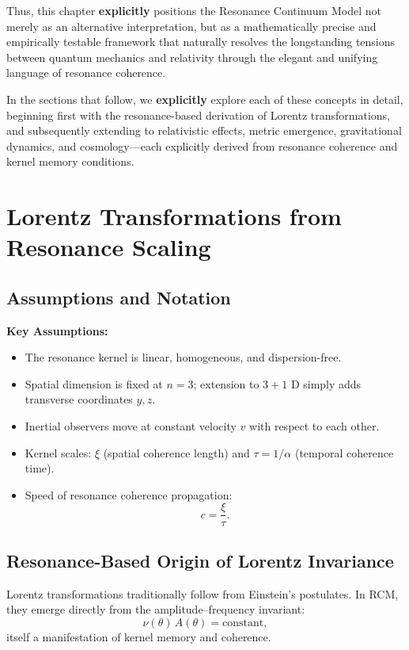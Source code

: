 Thus, this chapter \textbf{explicitly} positions the Resonance Continuum Model not merely as an alternative interpretation, but as a mathematically precise and empirically testable framework that naturally resolves the longstanding tensions between quantum mechanics and relativity through the elegant and unifying language of resonance coherence.

In the sections that follow, we \textbf{explicitly} explore each of these concepts in detail, beginning first with the resonance-based derivation of Lorentz transformations, and subsequently extending to relativistic effects, metric emergence, gravitational dynamics, and cosmology—each explicitly derived from resonance coherence and kernel memory conditions.

\section{Lorentz Transformations from Resonance Scaling}

\subsection{Assumptions and Notation}
\begin{framed}
\noindent\textbf{Key Assumptions:}
\begin{itemize}
  \item The resonance kernel is linear, homogeneous, and dispersion-free.
  \item Spatial dimension is fixed at \(n=3\); extension to \(3+1\) D simply adds transverse coordinates \(y,z\).
  \item Inertial observers move at constant velocity \(v\) with respect to each other.
  \item Kernel scales: \(\xi\) (spatial coherence length) and \(\tau = 1/\alpha\) (temporal coherence time).
  \item Speed of resonance coherence propagation:
    \begin{equation}
      c = \frac{\xi}{\tau}.
      \label{eq:resonance-speed}
    \end{equation}
\end{itemize}
\end{framed}

\subsection{Resonance-Based Origin of Lorentz Invariance}
Lorentz transformations traditionally follow from Einstein’s postulates. In RCM, they emerge directly from the amplitude–frequency invariant:
\begin{equation}
  \nu(\theta)\,A(\theta) = \text{constant},
  \label{eq:amp-freq-law}
\end{equation}
itself a manifestation of kernel memory and coherence.

